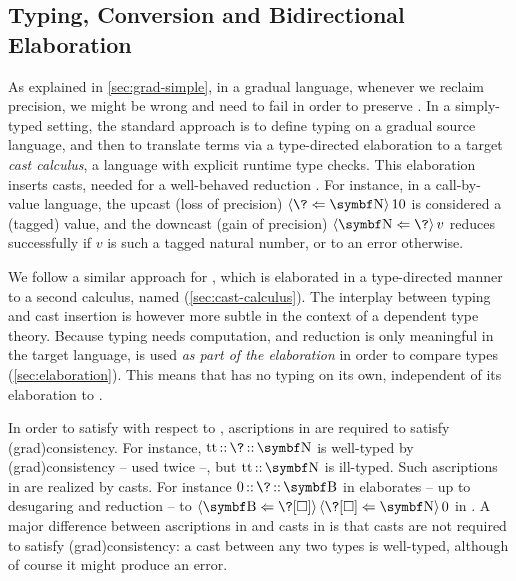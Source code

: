 \subsection{Typing, Conversion and Bidirectional Elaboration}

As explained in \cref{sec:grad-simple},
in a gradual language, whenever we reclaim precision, we might be wrong and need to fail in order to preserve .
%
In a simply-typed setting, the standard approach is to define typing on a
gradual source language, and then to translate terms via a type-directed elaboration
to a target \emph{cast calculus}, \ie a language with explicit runtime type
checks.
This elaboration inserts casts, needed for a well-behaved reduction .
For instance, in a call-by-value language, the upcast (loss of precision)
$\castrev{10}{\Nat}{\?}$ is considered a (tagged) value,
and the downcast (gain of precision) $\castrev{v}{\?}{\Nat}$ reduces successfully
if $v$ is such a tagged natural number, or to an error otherwise.

\AP We follow a similar approach for , which is
elaborated in a type-directed manner to a second calculus,
named  (\cref{sec:cast-calculus}).
The interplay between typing and cast insertion is however more subtle in the
context of a dependent type theory. Because typing needs computation, and
reduction is only meaningful in the target language,  is used
\emph{as part of the elaboration} in order to compare types (\cref{sec:elaboration}).
This means that  has no typing on its own, independent of its
elaboration to .%
%
%

In order to satisfy  with respect to , ascriptions in 
are required to satisfy \kl(grad){consistency}. For instance, $\asc{\asc{\true}{\?}}{\Nat}$ is well-typed by \kl(grad){consistency} – used twice –, but $\asc{\true}{\Nat}$ is ill-typed.
Such ascriptions in  are realized by casts.
For instance $\asc{\asc{0}{\?}}{\Bool}$ in  elaborates
– up to desugaring and reduction – to
$\castrev{\castrev{0}{\Nat}{\?[\uni]}}{\?[\uni]}{\Bool}$ in .
A major difference between ascriptions in  and casts in  is
that casts are not required to satisfy \kl(grad){consistency}: a cast between any
two types is well-typed, although of course it might produce an
error.

